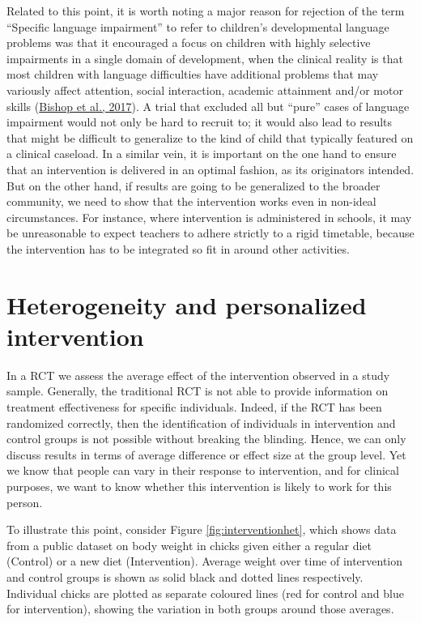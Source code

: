 \documentclass{krantz}
\begin{document}
Related to this point, it is worth noting a major reason for rejection of the term ``Specific language impairment'' to refer to children's developmental language problems was that it encouraged a focus on children with highly selective impairments in a single domain of development, when the clinical reality is that most children with language difficulties have additional problems that may variously affect attention, social interaction, academic attainment and/or motor skills (\protect\hyperlink{ref-bishop2017}{Bishop et al., 2017}). A trial that excluded all but ``pure'' cases of language impairment would not only be hard to recruit to; it would also lead to results that might be difficult to generalize to the kind of child that typically featured on a clinical caseload. In a similar vein, it is important on the one hand to ensure that an intervention is delivered in an optimal fashion, as its originators intended. But on the other hand, if results are going to be generalized to the broader community, we need to show that the intervention works even in non-ideal circumstances. For instance, where intervention is administered in schools, it may be unreasonable to expect teachers to adhere strictly to a rigid timetable, because the intervention has to be integrated so fit in around other activities.

\hypertarget{heterogeneity-and-personalized-intervention}{%
\section{Heterogeneity and personalized intervention}\label{heterogeneity-and-personalized-intervention}}

In a RCT we assess the average effect of the intervention observed in a study sample. Generally, the traditional RCT is not able to provide information on treatment effectiveness for specific individuals. Indeed, if the RCT has been randomized correctly, then the identification of individuals in intervention and control groups is not possible without breaking the blinding. Hence, we can only discuss results in terms of average difference or effect size at the group level. Yet we know that people can vary in their response to intervention, and for clinical purposes, we want to know whether this intervention is likely to work for this person.

To illustrate this point, consider Figure \ref{fig:interventionhet}, which shows data from a public dataset on body weight in chicks given either a regular diet (Control) or a new diet (Intervention). Average weight over time of intervention and control groups is shown as solid black and dotted lines respectively. Individual chicks are plotted as separate coloured lines (red for control and blue for intervention), showing the variation in both groups around those averages.
\end{document}
